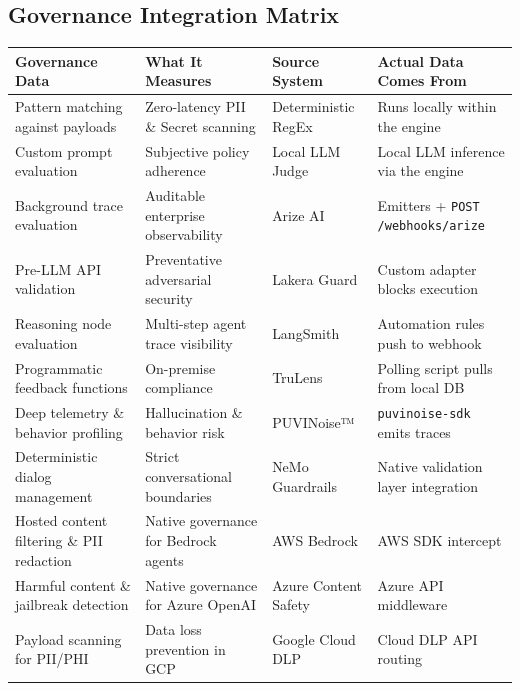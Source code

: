\documentclass[11pt,a4paper]{article}
\begin{document}
\subsection{Governance Integration Matrix}

\begin{table}[htbp]
\centering
\renewcommand{\arraystretch}{1.4}
\small
{}
\begin{tabularx}{\textwidth}{| >{\raggedright\arraybackslash}X >{\raggedright\arraybackslash}X >{\raggedright\arraybackslash}p{3cm} >{\raggedright\arraybackslash}X |}
\hline
\rowcolor{dpicloud!30} \textbf{Governance Data} & \textbf{What It Measures} & \textbf{Source System} & \textbf{Actual Data Comes From} \\
\hline
Pattern matching against payloads & Zero-latency PII \& Secret scanning & Deterministic RegEx & Runs locally within the engine \\
Custom prompt evaluation & Subjective policy adherence & Local LLM Judge & Local LLM inference via the engine \\
Background trace evaluation & Auditable enterprise observability & Arize AI & Emitters + \texttt{POST /webhooks/arize} \\
Pre-LLM API validation & Preventative adversarial security & Lakera Guard & Custom adapter blocks execution \\
Reasoning node evaluation & Multi-step agent trace visibility & LangSmith & Automation rules push to webhook \\
Programmatic feedback functions & On-premise compliance & TruLens & Polling script pulls from local DB \\
Deep telemetry \& behavior profiling & Hallucination \& behavior risk & PUVINoise™ & \texttt{puvinoise-sdk} emits traces \\
Deterministic dialog management & Strict conversational boundaries & NeMo Guardrails & Native validation layer integration \\
Hosted content filtering \& PII redaction & Native governance for Bedrock agents & AWS Bedrock & AWS SDK intercept \\
Harmful content \& jailbreak detection & Native governance for Azure OpenAI & Azure Content Safety & Azure API middleware \\
Payload scanning for PII/PHI & Data loss prevention in GCP & Google Cloud DLP & Cloud DLP API routing \\
\hline
\end{tabularx}
\end{table}
\end{document}

